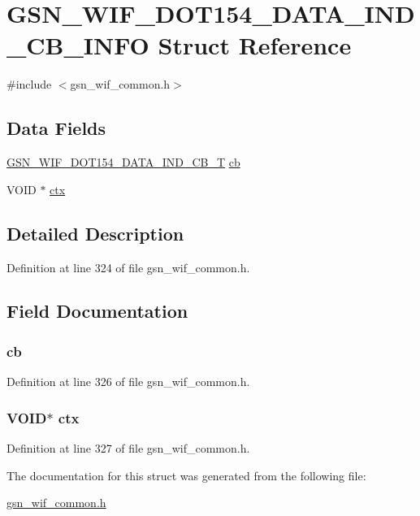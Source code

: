 \hypertarget{a00336}{
\section{GSN\_\-WIF\_\-DOT154\_\-DATA\_\-IND\_\-CB\_\-INFO Struct Reference}
\label{a00336}
}


{\ttfamily \#include $<$gsn\_\-wif\_\-common.h$>$}

\subsection*{Data Fields}
\begin{DoxyCompactItemize}
\item 
\hyperlink{a00635_gaeb1ca28d0827d970df3911f1bd46cf98}{GSN\_\-WIF\_\-DOT154\_\-DATA\_\-IND\_\-CB\_\-T} \hyperlink{a00336_a6d90028bfe461f740308101bb1aa8394}{cb}
\item 
VOID $\ast$ \hyperlink{a00336_add401254b29adaa41706c97d1c8d3e89}{ctx}
\end{DoxyCompactItemize}


\subsection{Detailed Description}


Definition at line 324 of file gsn\_\-wif\_\-common.h.



\subsection{Field Documentation}
\hypertarget{a00336_a6d90028bfe461f740308101bb1aa8394}{
\subsubsection[{cb}]{ {\bf cb}}}
\label{a00336_a6d90028bfe461f740308101bb1aa8394}


Definition at line 326 of file gsn\_\-wif\_\-common.h.

\hypertarget{a00336_add401254b29adaa41706c97d1c8d3e89}{
\subsubsection[{ctx}]{\setlength{\rightskip}{0pt plus 5cm}VOID$\ast$ {\bf ctx}}}
\label{a00336_add401254b29adaa41706c97d1c8d3e89}


Definition at line 327 of file gsn\_\-wif\_\-common.h.



The documentation for this struct was generated from the following file:\begin{DoxyCompactItemize}
\item 
\hyperlink{a00608}{gsn\_\-wif\_\-common.h}\end{DoxyCompactItemize}
